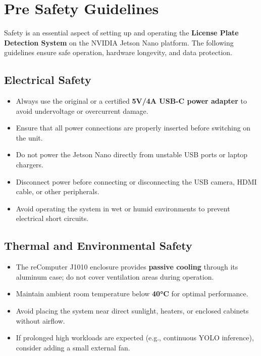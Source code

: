 \section{Pre Safety Guidelines}

Safety is an essential aspect of setting up and operating the \textbf{License Plate Detection System} on the NVIDIA Jetson Nano platform.  
The following guidelines ensure safe operation, hardware longevity, and data protection.

\subsection{Electrical Safety}
\begin{itemize}
	\item Always use the original or a certified \textbf{5V/4A USB-C power adapter} to avoid undervoltage or overcurrent damage.
	\item Ensure that all power connections are properly inserted before switching on the unit.
	\item Do not power the Jetson Nano directly from unstable USB ports or laptop chargers.
	\item Disconnect power before connecting or disconnecting the USB camera, HDMI cable, or other peripherals.
	\item Avoid operating the system in wet or humid environments to prevent electrical short circuits.
\end{itemize}

\subsection{Thermal and Environmental Safety}
\begin{itemize}
	\item The reComputer J1010 enclosure provides \textbf{passive cooling} through its aluminum case; do not cover ventilation areas during operation.
	\item Maintain ambient room temperature below \textbf{40°C} for optimal performance.
	\item Avoid placing the system near direct sunlight, heaters, or enclosed cabinets without airflow.
	\item If prolonged high workloads are expected (e.g., continuous YOLO inference), consider adding a small external fan.
\end{itemize}

